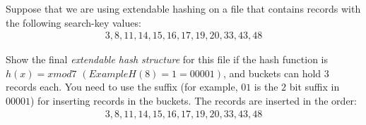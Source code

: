 


\question[5] Suppose that we are using extendable hashing on a file that contains 
records with the following search-key values:
\begin{align}
  3, 8, 11, 14, 15, 16, 17, 19, 20, 33, 43, 48
\end{align}

Show the final \textit{extendable hash structure} for this file if the hash function is 
$h(x) = x mod 7$ $(Example H(8) = 1 = 00001)$, and buckets can hold $3$ records each. 
You need to use the suffix (for example, $01$ is the $2$ bit suffix in $00001$) for 
inserting records in the buckets. The records are inserted in the order: 
\begin{align}
  3, 8, 11, 14, 15, 16, 17, 19, 20, 33, 43, 48
\end{align}


\begin{solution}[\fullpage]
\end{solution}
